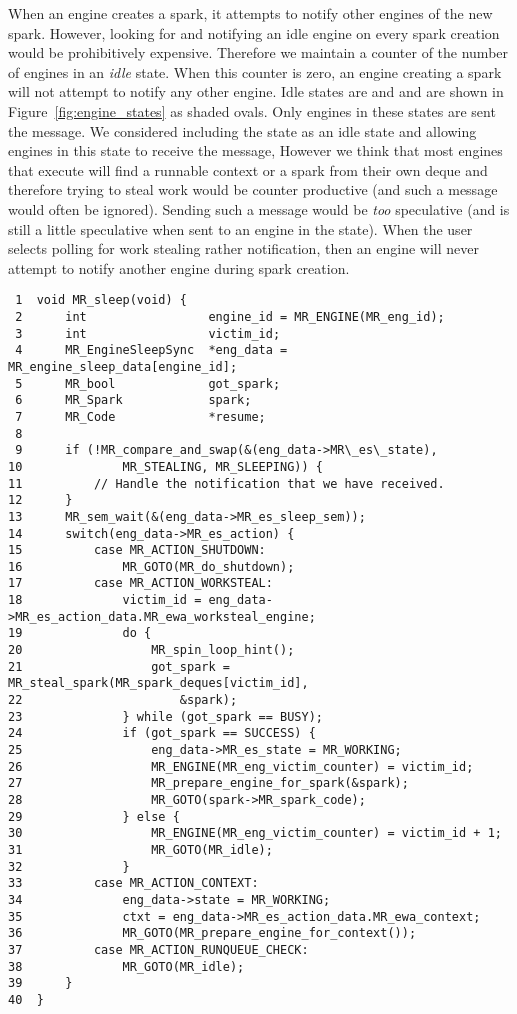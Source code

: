 When an engine creates a spark,
it attempts to notify other engines of the new spark.
However, looking for and notifying an idle engine on every spark creation
would be prohibitively expensive.
Therefore we maintain a counter of the number of engines in an \emph{idle}
state.
When this counter is zero, an engine creating a spark will not attempt to
notify any other engine.
Idle states are  and 
and are shown in Figure~\ref{fig:engine_states} as shaded ovals.
Only engines in these states are sent the  message.
We considered including the  state as an idle
state and allowing engines in this state to receive the
 message,
However we think that most engines that execute \idle will find a runnable
context or a spark from their own deque and therefore trying to steal work
would be counter productive (and such a message would often be ignored).
Sending such a message would be \emph{too} speculative
(and is still a little speculative when sent to an engine in the
 state).
When the user selects polling for work stealing rather notification,
then an engine will never attempt to notify another engine during spark
creation.

\begin{algorithm}[tbp]
\begin{verbatim}
 1  void MR_sleep(void) {
 2      int                 engine_id = MR_ENGINE(MR_eng_id);
 3      int                 victim_id;
 4      MR_EngineSleepSync  *eng_data = MR_engine_sleep_data[engine_id];
 5      MR_bool             got_spark;
 6      MR_Spark            spark;
 7      MR_Code             *resume;
 8
 9      if (!MR_compare_and_swap(&(eng_data->MR\_es\_state),
10              MR_STEALING, MR_SLEEPING)) {
11          // Handle the notification that we have received.
12      }
13      MR_sem_wait(&(eng_data->MR_es_sleep_sem));
14      switch(eng_data->MR_es_action) {
15          case MR_ACTION_SHUTDOWN:
16              MR_GOTO(MR_do_shutdown);
17          case MR_ACTION_WORKSTEAL:
18              victim_id = eng_data->MR_es_action_data.MR_ewa_worksteal_engine;
19              do {
20                  MR_spin_loop_hint();
21                  got_spark = MR_steal_spark(MR_spark_deques[victim_id],
22                      &spark);
23              } while (got_spark == BUSY);
24              if (got_spark == SUCCESS) {
25                  eng_data->MR_es_state = MR_WORKING;
26                  MR_ENGINE(MR_eng_victim_counter) = victim_id;
27                  MR_prepare_engine_for_spark(&spark);
28                  MR_GOTO(spark->MR_spark_code);
29              } else {
30                  MR_ENGINE(MR_eng_victim_counter) = victim_id + 1;
31                  MR_GOTO(MR_idle);
32              }
33          case MR_ACTION_CONTEXT:
34              eng_data->state = MR_WORKING;
35              ctxt = eng_data->MR_es_action_data.MR_ewa_context;
36              MR_GOTO(MR_prepare_engine_for_context());
37          case MR_ACTION_RUNQUEUE_CHECK:
38              MR_GOTO(MR_idle);
39      }
40  }
\end{verbatim}
\caption{\sleep}
\label{alg:sleep}
\end{algorithm}

